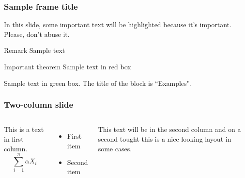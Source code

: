 \documentclass{article}
\begin{document}
\begin{frame}
\frametitle{Sample frame title}

In this slide, some important text will be
\alert{highlighted} because it's important.
Please, don't abuse it.

\begin{block}{Remark}
Sample text
\end{block}

\begin{alertblock}{Important theorem}
Sample text in red box
\end{alertblock}

\begin{examples}
Sample text in green box. The title of the block is ``Examples".
\end{examples}
\end{frame}


\begin{frame}
\frametitle{Two-column slide}

\begin{columns}

This is a text in first column.
$$\sum_{i=1}^{n} \alpha X_i$$
\begin{itemize}
\item First item
\item Second item
\end{itemize}

This text will be in the second column
and on a second tought this is a nice looking
layout in some cases.
\end{columns}
\end{frame}
\end{document}
